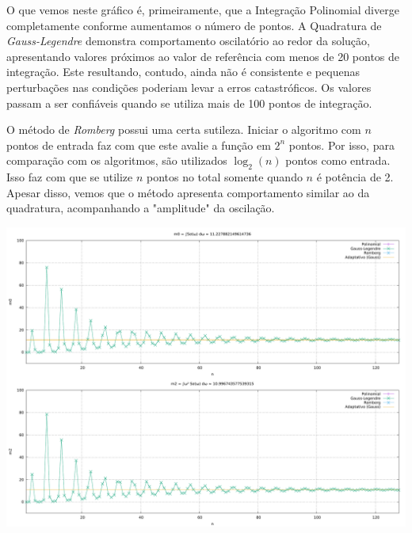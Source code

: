 \documentclass{homework}
\begin{document}
	O que vemos neste gráfico é, primeiramente, que a Integração Polinomial diverge completamente conforme aumentamos o número de pontos. A Quadratura de \textit{Gauss-Legendre} demonstra comportamento oscilatório ao redor da solução, apresentando valores próximos ao valor de referência com menos de 20 pontos de integração. Este resultando, contudo, ainda não é consistente e pequenas perturbações nas condições poderiam levar a erros catastróficos. Os valores passam a ser confiáveis quando se utiliza mais de 100 pontos de integração.\par
	O método de \textit{Romberg} possui uma certa sutileza. Iniciar o algoritmo com $n$ pontos de entrada faz com que este avalie a função em $2^n$ pontos. Por isso, para comparação com os algoritmos, são utilizados $\log_2(n)$ pontos como entrada. Isso faz com que se utilize $n$ pontos no total somente quando $n$ é potência de 2. Apesar disso, vemos que o método apresenta comportamento similar ao da quadratura, acompanhando a "amplitude" da oscilação.
	
	\questx[Repita o exercício anterior considerando \\$S_\eta(\omega) = {\displaystyle \frac{4 \pi^3 Hs^2}{\omega^5 Tz^4}} \exp\left(\displaystyle -\frac{16 \pi^3}{\omega^4 Tz^4}\right)$ com $Hs = 3.0$ e $Tz = 5.0$]
	
	
	
	\begin{fig}
		\includegraphics[width=\textwidth]{../src/plot/L5-Q4.pdf}
	\end{fig}
	
\end{document}
